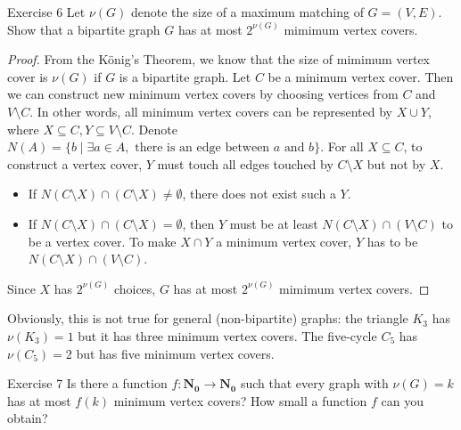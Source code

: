     \newpage

    \begin{thm}{Exercise 6}{}
        Let $\nu(G)$ denote the size of a maximum matching of $G=(V,E)$.
        Show that a bipartite graph $G$ has at most $2^{\nu(G)}$ mimimum vertex covers.
    \end{thm}
    \begin{proof}
        From the K\"{o}nig's Theorem, we know that the size of mimimum vertex cover is $\nu(G)$ if $G$ is a bipartite graph.
        Let $C$ be a minimum vertex cover.
        Then we can construct new minimum vertex covers by choosing vertices from $C$ and $V\setminus C$.
        In other words, all minimum vertex covers can be represented by $X\cup Y$, where $X\subseteq C, Y \subseteq V\setminus C$.
        Denote $N(A)=\{b \mid \exists a\in A, \text{ there is an edge between } a \text{ and } b \}$.
        For all $X\subseteq C$, to construct a vertex cover, $Y$ must touch all edges touched by $C\setminus X$ but not by $X$.
        \begin{itemize}
            \item If $N(C\setminus X)\cap (C\setminus X)\ne \emptyset$, there does not exist such a $Y$.
            \item  If $N(C\setminus X)\cap (C\setminus X)= \emptyset$, then $Y$ must be at least $N(C\setminus X) \cap (V\setminus C)$ to be a vertex cover.
            To make $X\cap Y$ a minimum vertex cover, $Y$ has to be $N(C\setminus X) \cap (V\setminus C)$.
        \end{itemize}
        
        Since $X$ has $2^{\nu(G)}$ choices, $G$ has at most $2^{\nu(G)}$ mimimum vertex covers.
    \end{proof}

    \newpage

    Obviously, this is not true for general (non-bipartite) graphs: the triangle $K_3$ has $\nu(K_3) = 1$ but it has three minimum vertex covers. The five-cycle $C_5$ has $\nu(C_5) = 2$ but has five minimum vertex covers.

    \begin{thm}{Exercise 7}{}
        Is there a function $f \colon \mathbf{N_0} \rightarrow \mathbf{N_0}$ such that every graph with $\nu(G) = k$ has at most $f(k)$ minimum vertex covers? How small a function $f$ can you obtain?
    \end{thm}

